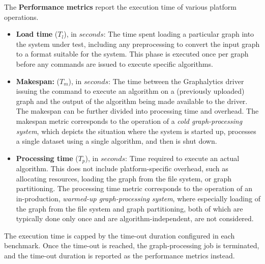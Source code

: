 The {\bf Performance metrics} report the execution time of various platform operations.

\begin{itemize}
	\item {\bf Load time} ($T_l$), in $\textit{seconds}$:  The time spent loading a particular graph into the system under test, including any preprocessing to convert the input graph to a format suitable for the system. This phase is executed once per graph before any commands are issued to execute specific algorithms.
	\item {\bf Makespan:} ($T_m$), in $\textit{seconds}$: The time between the Graphalytics driver issuing the command to execute an algorithm on a (previously uploaded) graph and the output of the algorithm being made available to the driver. The makespan can be further divided into processing time and overhead. The makespan metric corresponds to the operation of a {\it cold graph-processing system}, which depicts the situation where the system is started up, processes a single dataset using a single algorithm, and then is shut down.
	\item {\bf Processing time} ($T_p$), in $\textit{seconds}$: Time required to execute an actual algorithm. This does not include platform-specific overhead, such as allocating resources, loading the graph from the file system, or graph partitioning. The processing time metric corresponds to the operation of an in-production, {\it warmed-up graph-processing system}, where especially loading of the graph from the file system and graph partitioning, both of which are typically done only once and are algorithm-independent, are not considered.
\end{itemize}

The execution time is capped by the time-out duration configured in each benchmark. Once the time-out is reached, the graph-processing job is terminated, and the time-out duration is reported as the performance metrics instead.


